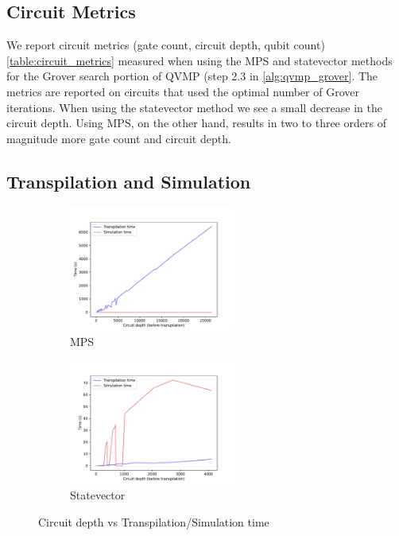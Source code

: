 \documentclass[conference]{IEEEtran}
\begin{document}
\subsection{Circuit Metrics}

We report circuit metrics (gate count, circuit depth, qubit count)
\cref{table:circuit_metrics} measured when using the MPS and statevector methods
for the Grover search portion of QVMP (step 2.3 in \cref{alg:qvmp_grover}. The
metrics are reported on circuits that used the optimal number of Grover
iterations. When using the statevector method we see a small decrease in the
circuit depth. Using MPS, on the other hand, results in two to three orders of
magnitude more gate count and circuit depth.

\subsection{Transpilation and Simulation}

\begin{figure}[h!]
  \begin{subfigure}{0.48\textwidth}
    \centering
    \includegraphics[width=0.6\textwidth]{../../results/figures/circuit_depth_v_tran_time_and_sim_time-MPS.pdf}
    \caption{MPS}
  \end{subfigure}
  \begin{subfigure}{0.48\textwidth}
    \centering
    \includegraphics[width=0.6\textwidth]{../../results/figures/circuit_depth_v_tran_time_and_sim_time-statevector_cpu.pdf}
    \caption{Statevector}
  \end{subfigure}
  \caption{Circuit depth vs Transpilation/Simulation time}
  \label{fig:circuit_depth_of_trans_v_sim}
\end{figure}
\end{document}
